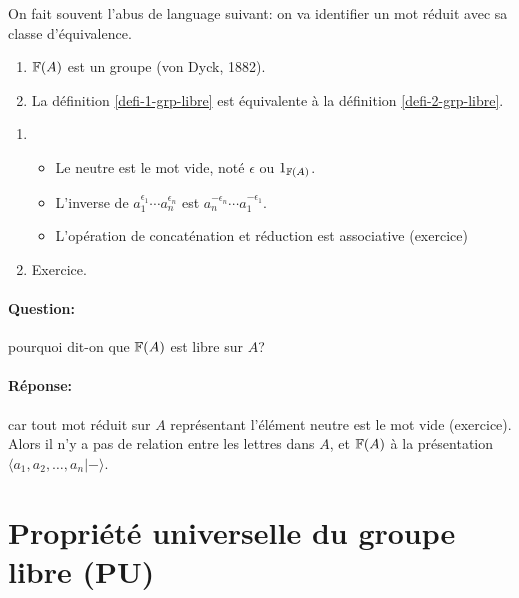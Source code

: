   On fait souvent l'abus de language suivant: on va identifier un mot réduit avec sa classe d'équivalence.

  \begin{prop}
    \begin{enumerate}
    \item $\mathbb{F}(A)$ est un groupe (von Dyck, 1882).
    \item La définition \ref{defi-1-grp-libre} est équivalente à la définition \ref{defi-2-grp-libre}.
    \end{enumerate}
  \end{prop}

  \begin{preuve}
    \begin{enumerate}
    \item
      \begin{itemize}
      \item Le neutre est le mot vide, noté $\epsilon$ ou $1_{\mathbb{F}(A)}$.
      \item L'inverse de $a_1^{\epsilon_1} \cdots a_n^{\epsilon_n}$ est $a_n^{-\epsilon_n} \cdots
        a_1^{-\epsilon_1}$.
      \item L'opération de concaténation et réduction est associative (exercice)
      \end{itemize}

    \item Exercice. \qedhere
    \end{enumerate}
  \end{preuve}

  \paragraph{Question:} pourquoi dit-on  que $\mathbb{F}(A)$ est libre sur $A$?
  \paragraph{Réponse:} car tout mot réduit sur $A$ représentant l'élément neutre est le mot vide
  (exercice). Alors il n'y a pas de relation entre les lettres dans $A$, et $\mathbb{F}(A)$ à la présentation $\langle
  a_1, a_2, \ldots, a_n | - \rangle$.

  \section{Propriété universelle du groupe libre (PU)}
  \label{sec:propriete-universelle}
  
